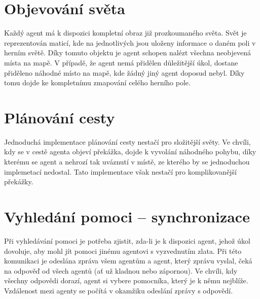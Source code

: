 \section{Objevování světa}

Každý agent má k dispozici kompletní obraz již prozkoumaného světa. Svět je reprezentován maticí, kde na jednotlivých jsou uloženy informace o daném poli v herním světě. Díky tomuto objektu je agent schopen nalézt všechna neobjevená místa na mapě. V případě, že agent nemá přidělen důležitější úkol, dostane přiděleno náhodné místo na mapě, kde žádný jiný agent doposud nebyl. Díky tomu dojde ke kompletnímu zmapování celého herního pole.

\section{Plánování cesty}

Jednoduchá implementace plánování cesty nestačí pro složitější světy. Ve chvíli, kdy se v cestě agenta objeví překážka, dojde k vyvolání náhodného pohybu, díky kterému se agent  a nehrozí tak uváznutí v místě, ze kterého by se jednoduchou implemetací nedostal. Tato implementace však nestačí pro komplikovanější překážky.

\section{Vyhledání pomoci – synchronizace}

Při vyhledávání pomoci je potřeba zjistit, zda-li je k dispozici agent, jehož úkol dovoluje, aby mohl jít pomoci jinému agentovi s vyzvednutím zlata. Při této komunikaci je odeslána zpráva všem agentům a agent, který zprávu vyslal, čeká na odpověď od všech agentů (ať už kladnou nebo zápornou). Ve chvíli, kdy všechny odpovědi dorazí, agent si vybere pomocníka, který je k němu nejblíže. Vzdálenost mezi agenty se počítá v okamžiku odeslání zprávy s odpovědí.